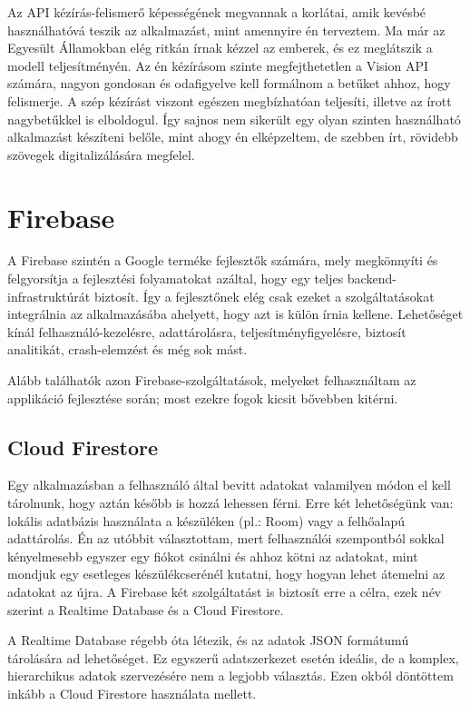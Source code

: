 Az API kézírás-felismerő képességének megvannak a korlátai, amik kevésbé használhatóvá teszik az alkalmazást, mint amennyire én terveztem. Ma már az Egyesült Államokban elég ritkán írnak kézzel az emberek, és ez meglátszik a modell teljesítményén. Az én kézírásom szinte megfejthetetlen a Vision API számára, nagyon gondosan és odafigyelve kell formálnom a betűket ahhoz, hogy felismerje. A szép kézírást viszont egészen megbízhatóan teljesíti, illetve az írott nagybetűkkel is elboldogul. Így sajnos nem sikerült egy olyan szinten használható alkalmazást készíteni belőle, mint ahogy én elképzeltem, de szebben írt, rövidebb szövegek digitalizálására megfelel.

\section{Firebase}

A Firebase szintén a Google terméke fejlesztők számára, mely megkönnyíti és felgyorsítja a fejlesztési folyamatokat azáltal, hogy egy teljes backend-infrastruktúrát biztosít. Így a fejlesztőnek elég csak ezeket a szolgáltatásokat integrálnia az alkalmazásába ahelyett, hogy azt is külön írnia kellene. Lehetőséget kínál felhasználó-kezelésre, adattárolásra, teljesítményfigyelésre, biztosít analitikát, crash-elemzést és még sok mást.

Alább találhatók azon Firebase-szolgáltatások, melyeket felhasználtam az applikáció fejlesztése során; most ezekre fogok kicsit bővebben kitérni.

\subsection{Cloud Firestore}
Egy alkalmazásban a felhasználó által bevitt adatokat valamilyen módon el kell tárolnunk, hogy aztán később is hozzá lehessen férni. Erre két lehetőségünk van: lokális adatbázis használata a készüléken (pl.: Room) vagy a felhőalapú adattárolás. Én az utóbbit választottam, mert felhasználói szempontból sokkal kényelmesebb egyszer egy fiókot csinálni és ahhoz kötni az adatokat, mint mondjuk egy esetleges készülékcserénél kutatni, hogy hogyan lehet átemelni az adatokat az újra. A Firebase két szolgáltatást is biztosít erre a célra, ezek név szerint a Realtime Database és a Cloud Firestore.

A Realtime Database régebb óta létezik, és az adatok JSON formátumú tárolására ad lehetőséget. Ez egyszerű adatszerkezet esetén ideális, de a komplex, hierarchikus adatok szervezésére nem a legjobb választás. Ezen okból döntöttem inkább a Cloud Firestore használata mellett.

